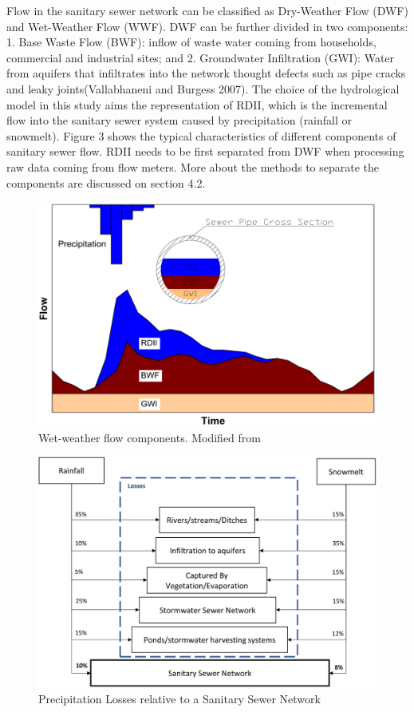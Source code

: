 



Flow in the sanitary sewer network can be classified as Dry-Weather Flow (DWF) and Wet-Weather Flow (WWF). DWF can be further divided in two components: 1. Base Waste Flow (BWF): inflow of waste water coming from households, commercial and industrial sites; and 2. Groundwater Infiltration (GWI): Water from aquifers that infiltrates into the network thought defects such as pipe cracks and leaky joints(Vallabhaneni and Burgess 2007). 
The choice of the hydrological model in this study aims the representation of RDII, which is the incremental flow into the sanitary sewer system caused by precipitation (rainfall or snowmelt). Figure 3 shows the typical characteristics of different components of sanitary sewer flow. RDII needs to be first separated from DWF when processing raw data coming from flow meters. More about the methods to separate the components are discussed on section 4.2.


\begin{figure}[ht]
    \centering
	\includegraphics[scale=0.6]{figures/RDII_flows.png}
	\caption{Wet-weather flow components. Modified from \cite{Vallabhaneni2007}}
	\label{fig:flowcomponents}
\end{figure}


\begin{figure}[ht]
    \centering
	\includegraphics[scale=0.4]{figures/losses.png}
	\caption{Precipitation Losses relative to a Sanitary Sewer Network}
	\label{fig:losses}
\end{figure}

